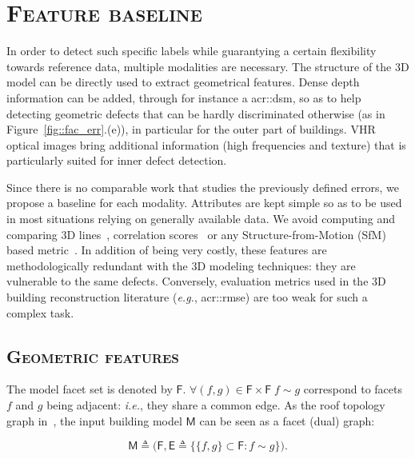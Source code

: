 \minitoc

\vfill

\clearpage

\section{\textsc{Feature baseline}}
    In order to detect such specific labels while guarantying a certain flexibility towards reference data, multiple modalities are necessary.
    The structure of the 3D model can be directly used to extract geometrical features.
    Dense depth information can be added, through for instance a \gls{acr::dsm}, so as to help detecting geometric defects that can be hardly discriminated otherwise (as in Figure~\ref{fig::fac_err}.(e)), in particular for the outer part of buildings. VHR optical images bring additional information (high frequencies and texture) that is particularly suited for inner defect detection.

    Since there is no comparable work that studies the previously defined errors, we propose a baseline for each modality.
    Attributes are kept simple so as to be used in most situations relying on generally available data. We avoid computing and comparing 3D lines~\parencite{michelin2013quality}, correlation scores~\parencite{boudet2006supervised} or any Structure-from-Motion (SfM) based metric~\parencite{kowdle2011active}.
    In addition of being very costly, these features are methodologically redundant with the 3D modeling techniques: they are vulnerable to the same defects.
    Conversely, evaluation metrics used in the 3D building reconstruction literature (\textit{e.g.}, \gls{acr::rmse}) are too weak for such a complex task.

    \subsection{\textsc{Geometric features}}
        The model facet set is denoted by $\mathsf{F}$.
        $\forall (f, g) \in \mathsf{F} \times \mathsf{F} \; f \sim g$ correspond to facets $f$ and $g$ being adjacent:
        \textit{i.e.}, they share a common edge. As the roof topology graph in~\parencite{verma20063d}, the input building model $\mathsf{M}$ can be seen as a facet (dual) graph:

        \begin{equation}
        	\label{eq::model_graph}
        	\mathsf{M} \triangleq \Big(\mathsf{F}, \mathsf{E} \triangleq \big\{ \{f, g\} \subset \mathsf{F} : f \sim g \big\} \Big).
        \end{equation}

